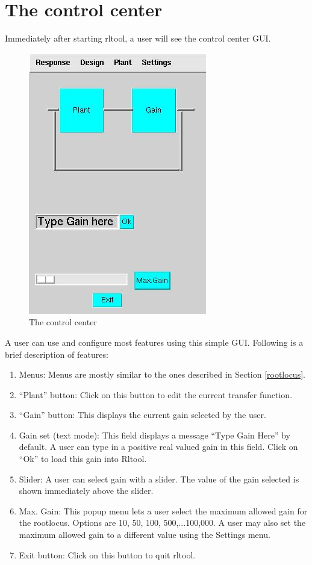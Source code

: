 \section{The control center}
Immediately after starting rltool, a user will see the control center
GUI.
\begin{figure}
\centerline{\includegraphics[width=2 in]{Rlt_GUI}}
\caption{The control center}
\label{Rlt_GUI}
\end{figure}
A user can use and configure most features using this simple
GUI. Following is a brief description of features:
\begin{enumerate}
\item Menus: Menus are mostly similar to the ones described in Section
  \ref{rootlocus}.
\item ``Plant'' button: Click on this button to edit the current
  transfer function.
\item ``Gain'' button: This displays the current gain selected by the
  user.
\item Gain set (text mode): This field displays a message ``Type Gain
  Here'' by default. A user can type in a positive real valued gain in
  this field. Click on ``Ok'' to load this gain into Rltool. 
\item Slider: A user can select gain with a slider. The value of the
  gain selected is shown immediately above the slider.
\item Max. Gain: This popup menu lets a user select the maximum
  allowed gain for the rootlocus. Options are 10, 50, 100,
  500,...100,000. A user may also set the maximum allowed gain to a
  different value using the Settings menu. 
\item Exit button: Click on this button to quit rltool. 
\end{enumerate} 
